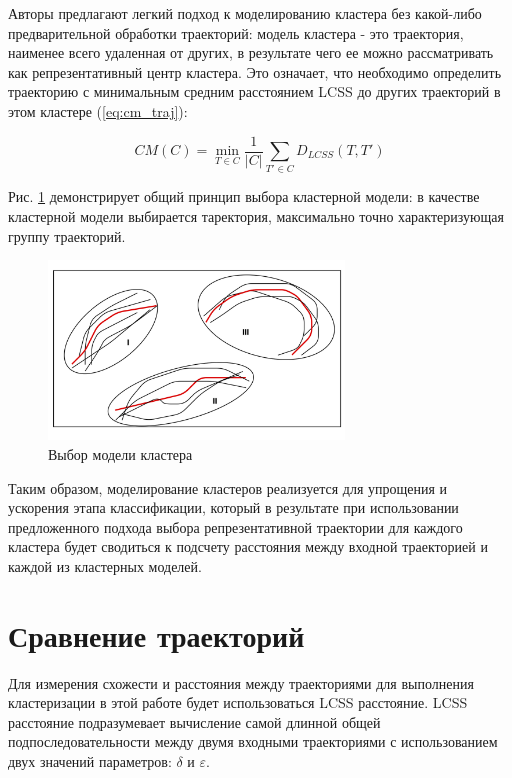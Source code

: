 Авторы \cite{inproceedings:7_related_work} предлагают легкий подход к моделированию кластера без какой-либо предварительной обработки траекторий: модель кластера - это траектория, наименее всего удаленная от других, в результате чего ее можно рассматривать как репрезентативный центр кластера. Это означает, что необходимо определить траекторию с минимальным средним расстоянием LCSS до других траекторий в этом кластере (\ref{eq:cm_traj}):

\begin{equation} \label{eq:cm_traj}
	CM(C) = \min\limits_{T \in C} \frac{1}{|C|} \sum_{T' \in C} D_{LCSS}(T, T')
\end{equation}

Рис. \ref{fig:cm-modeling} демонстрирует общий принцип выбора кластерной модели: в качестве кластерной модели выбирается таректория, максимально точно характеризующая группу траекторий.

\begin{figure}[!htb]
	\centering{}
	\includegraphics[width=0.7\textwidth]{images/cm-modeling.png}
	\caption{Выбор модели кластера}
	\label{fig:cm-modeling}
\end{figure}

Таким образом, моделирование кластеров реализуется для упрощения и ускорения этапа классификации, который в результате при использовании предложенного подхода выбора репрезентативной траектории для каждого кластера будет сводиться к подсчету расстояния между входной траекторией и каждой из кластерных моделей.

\section{Сравнение траекторий}

Для измерения схожести и расстояния между траекториями для выполнения кластеризации в этой работе будет использоваться LCSS расстояние. LCSS расстояние подразумевает вычисление самой длинной общей подпоследовательности между двумя входными траекториями с использованием двух значений параметров: $\delta$ и $\varepsilon$.

